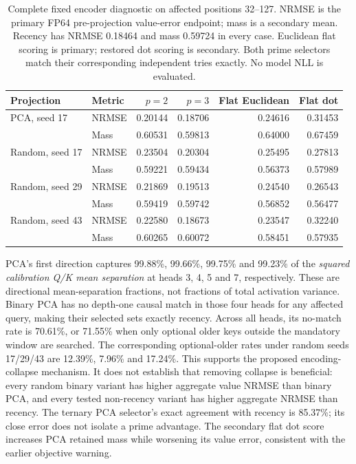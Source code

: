\documentclass[11pt]{article}
\begin{document}
\begin{table}[htbp]
\centering
\small
\caption{Complete fixed encoder diagnostic on affected positions 32--127.
NRMSE is the primary FP64 pre-projection value-error endpoint; mass is a secondary
mean. Recency has NRMSE 0.18464 and mass 0.59724 in every case. Euclidean flat
scoring is primary; restored dot scoring is secondary. Both prime selectors
match their corresponding independent tries exactly. No model NLL is evaluated.}
\begin{tabular}{llrrrr}
\toprule
Projection & Metric & \(p=2\) & \(p=3\) & Flat Euclidean & Flat dot\\
\midrule
PCA, seed 17 & NRMSE & 0.20144 & 0.18706 & 0.24616 & 0.31453\\
 & Mass & 0.60531 & 0.59813 & 0.64000 & 0.67459\\
Random, seed 17 & NRMSE & 0.23504 & 0.20304 & 0.25495 & 0.27813\\
 & Mass & 0.59221 & 0.59434 & 0.56373 & 0.57989\\
Random, seed 29 & NRMSE & 0.21869 & 0.19513 & 0.24540 & 0.26543\\
 & Mass & 0.59419 & 0.59742 & 0.56852 & 0.56477\\
Random, seed 43 & NRMSE & 0.22580 & 0.18673 & 0.23547 & 0.32240\\
 & Mass & 0.60265 & 0.60072 & 0.58451 & 0.57935\\
\bottomrule
\end{tabular}
\label{tab:encoder-gate}
\end{table}

PCA's first direction captures 99.88\%, 99.66\%, 99.75\% and 99.23\% of the
\emph{squared calibration Q/K mean separation} at heads 3, 4, 5 and 7,
respectively. These are directional mean-separation fractions, not fractions
of total activation variance. Binary PCA has no depth-one causal match in
those four heads for any affected query, making their selected sets exactly
recency. Across all heads, its no-match rate is 70.61\%, or 71.55\% when only
optional older keys outside the mandatory window are searched. The corresponding
optional-older rates under random seeds 17/29/43 are 12.39\%, 7.96\% and 17.24\%.
This supports the proposed encoding-collapse mechanism. It does not establish
that removing collapse is beneficial: every random binary variant has higher
aggregate value NRMSE than binary PCA, and every tested non-recency variant
has higher aggregate NRMSE than recency. The ternary PCA selector's exact
agreement with recency is 85.37\%; its close error does not isolate a prime
advantage. The secondary flat dot score increases PCA retained mass while
worsening its value error, consistent with the earlier objective warning.
\end{document}
